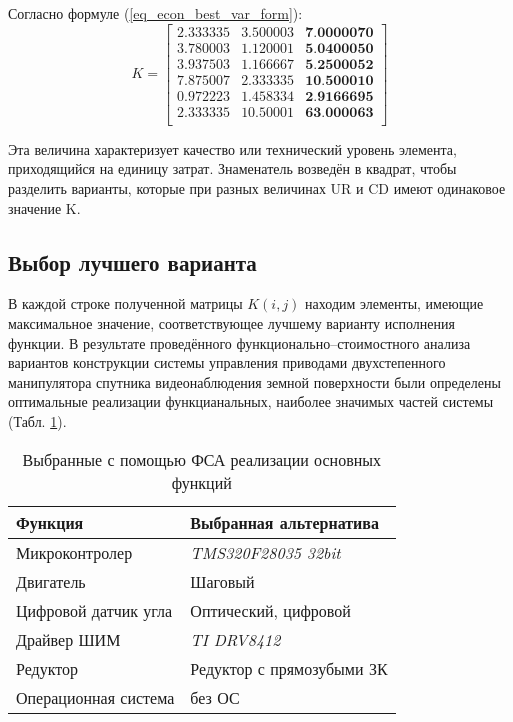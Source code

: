 Согласно формуле (\ref{eq_econ_best_var_form}):
\begin{equation}
    K =
        \begin{bmatrix}
            2.333335 & 3.500003 & \textbf{7.0000070} \\
            3.780003 & 1.120001 & \textbf{5.0400050} \\
            3.937503 & 1.166667 & \textbf{5.2500052} \\
            7.875007 & 2.333335 & \textbf{10.500010} \\
            0.972223 & 1.458334 & \textbf{2.9166695} \\
            2.333335 & 10.50001 & \textbf{63.000063} \\
        \end{bmatrix}
    \label{eq_econ_best_var}
\end{equation}

Эта величина характеризует качество или технический уровень
элемента, приходящийся на единицу затрат. Знаменатель возведён в квадрат,
чтобы разделить варианты, которые при разных величинах UR и CD имеют
одинаковое значение K.

\newpage
\subsection{Выбор лучшего варианта}
В каждой строке полученной матрицы $K(i, j)$ находим элементы,
имеющие максимальное значение, соответствующее лучшему варианту
исполнения функции.
В результате проведённого функционально--стоимостного анализа
вариантов конструкции системы управления приводами двухстепенного манипулятора
спутника видеонаблюдения земной поверхности были определены оптимальные
реализации функцианальных, наиболее значимых частей системы
(Табл. \ref{tbl_econ_result}).

\begin{table}[ht!]
    \centering
    \begin{tabular}{|l|l|}
        \hline
        Функция & Выбранная альтернатива \\
        \hline
        \hline
        Микроконтролер & \textit{TMS320F28035 32bit} \\
        \hline
        Двигатель & Шаговый \\
        \hline
        Цифровой датчик угла & Оптический, цифровой \\
        \hline
        Драйвер ШИМ & \textit{TI DRV8412} \\
        \hline
        Редуктор & Редуктор с прямозубыми ЗК \\
        \hline
        Операционная система & без ОС \\
        \hline
    \end{tabular}
    \caption{Выбранные с помощью ФСА реализации основных функций}
    \label{tbl_econ_result}
\end{table}

